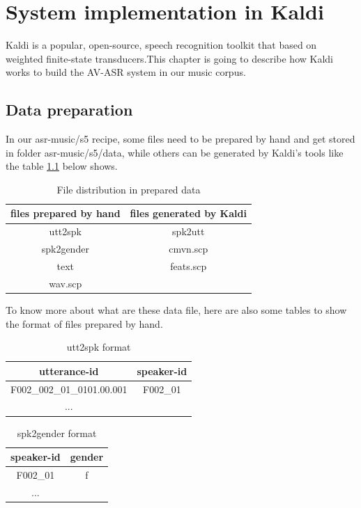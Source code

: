 \chapter{System implementation in Kaldi}
Kaldi is a popular, open-source, speech recognition toolkit that based on weighted finite-state transducers.This chapter is going to describe how Kaldi works to build the AV-ASR system in our music corpus.
\section{Data preparation}

In our asr-music/s5 recipe, some files need to be prepared by hand and get stored in folder asr-music/s5/data, while others can be generated by Kaldi's tools like the table \ref{tab:datafile} below shows.

\begin{table}[ht]
\center
\begin{tabular}{c|c}
files prepared by hand & files generated by Kaldi \\
\hline
utt2spk & spk2utt\\
spk2gender & cmvn.scp\\
text & feats.scp \\
wav.scp &  \\ 
\end{tabular}
\caption{File distribution in prepared data}
\label{tab:datafile}
\end{table}

To know more about what are these data file, here are also some tables to show the format of files prepared by hand.

\begin{table}[ht]
\center
\begin{tabular}{c|c}

utterance-id & speaker-id \\ \hline
F002\_002\_01\_0101.00.001  & F002\_01\\
...\\ \hline
\end{tabular}
\caption{utt2spk format}
\label{tab:utt2spk}
\end{table}

\begin{table}[ht]
\center
\begin{tabular}{c|c}

speaker-id & gender\\ \hline
F002\_01 & f\\
...\\ \hline
\end{tabular}
\caption{spk2gender format}
\label{tab:spk2gender}
\end{table}


